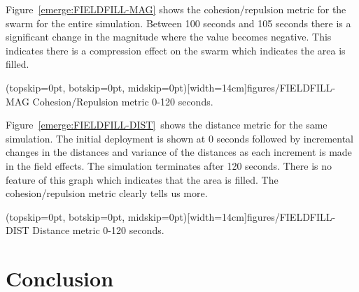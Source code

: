 \documentclass{ieeeaccess}
\begin{document}
Figure~\ref{emerge:FIELDFILL-MAG} shows the cohesion/repulsion metric for the
swarm for the entire simulation. Between 100 seconds and 105 seconds there is a
significant change in the magnitude where the value becomes negative. This
indicates there is a compression effect on the swarm which indicates the area
is filled.

\Figure[t!](topskip=0pt, botskip=0pt,
midskip=0pt)[width=14cm]{figures/FIELDFILL-MAG} {Cohesion/Repulsion metric
0-120 seconds.\label{emerge:FIELDFILL-MAG}}


Figure~\ref{emerge:FIELDFILL-DIST}~shows the distance metric for the same
simulation. The initial deployment is shown at 0 seconds followed by
incremental changes in the distances and variance of the distances as each
increment is made in the field effects. The simulation terminates after 120
seconds. There is no feature of this graph which indicates that the area is
filled. The cohesion/repulsion metric clearly tells us more. 

\Figure[t!](topskip=0pt, botskip=0pt,
midskip=0pt)[width=14cm]{figures/FIELDFILL-DIST} {Distance metric 0-120
seconds.\label{emerge:FIELDFILL-DIST}}


\section{Conclusion}\label{Section:MagnitudeDistanceComparison}
\end{document}
